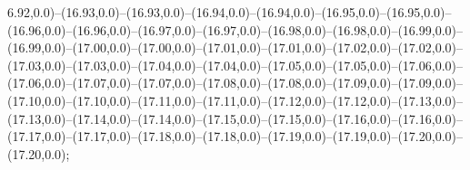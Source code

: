 6.92,0.0)--(16.93,0.0)--(16.93,0.0)--(16.94,0.0)--(16.94,0.0)--(16.95,0.0)--(16.95,0.0)--(16.96,0.0)--(16.96,0.0)--(16.97,0.0)--(16.97,0.0)--(16.98,0.0)--(16.98,0.0)--(16.99,0.0)--(16.99,0.0)--(17.00,0.0)--(17.00,0.0)--(17.01,0.0)--(17.01,0.0)--(17.02,0.0)--(17.02,0.0)--(17.03,0.0)--(17.03,0.0)--(17.04,0.0)--(17.04,0.0)--(17.05,0.0)--(17.05,0.0)--(17.06,0.0)--(17.06,0.0)--(17.07,0.0)--(17.07,0.0)--(17.08,0.0)--(17.08,0.0)--(17.09,0.0)--(17.09,0.0)--(17.10,0.0)--(17.10,0.0)--(17.11,0.0)--(17.11,0.0)--(17.12,0.0)--(17.12,0.0)--(17.13,0.0)--(17.13,0.0)--(17.14,0.0)--(17.14,0.0)--(17.15,0.0)--(17.15,0.0)--(17.16,0.0)--(17.16,0.0)--(17.17,0.0)--(17.17,0.0)--(17.18,0.0)--(17.18,0.0)--(17.19,0.0)--(17.19,0.0)--(17.20,0.0)--(17.20,0.0);